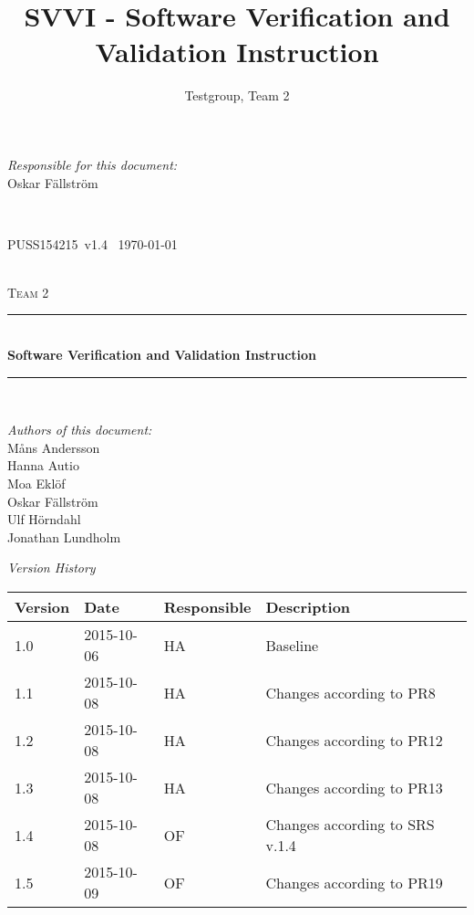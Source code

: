 \documentclass[a4paper]{article}
\title{SVVI - Software Verification and Validation Instruction}
\author{Testgroup, Team 2}
\newcommand{\version}{v1.4}
\newcommand{\SVVI}{PUSS154215}
\begin{document}
\begin{titlepage}
\newcommand{\HRule}{\rule{\linewidth}{0.5mm}}

\begin{minipage}{0.5\textwidth}
\begin{flushleft} %
\textit{Responsible for this document:}\\
Oskar Fällström %
\end{flushleft}
\end{minipage}
~
\begin{minipage}{0.4\textwidth}
\begin{flushright}
\SVVI\ \version\ %
\today
\end{flushright}
\end{minipage}\\[3cm]

\centering
\textsc{\LARGE Team 2}\\[0.5cm]

\HRule \\[0.4cm]
{ \huge \bfseries Software Verification and Validation Instruction}\\[0.4cm] %
\HRule \\[1.5cm]

\vfill
\begin{flushleft}
\textit{Authors of this document:}\\
Måns Andersson \\
Hanna Autio \\
Moa Eklöf \\
Oskar Fällström \\
Ulf Hörndahl \\
Jonathan Lundholm
\end{flushleft}


\end{titlepage}

\begin{center}
\textit{\large Version History}

    \begin{tabular}{ | l | l | l | p{5cm} |}
    \hline
    \textbf{Version}		& \textbf{Date}		& \textbf{Responsible}					& \textbf{Description}					\\ \hline
    1.0						& 2015-10-06			& HA									& Baseline								\\ \hline
    1.1						& 2015-10-08			& HA									& Changes according to PR8				\\ \hline
    1.2						& 2015-10-08			& HA									& Changes according to PR12 		\\ \hline
    1.3						& 2015-10-08			& HA									& Changes according to PR13		\\ \hline
    1.4						& 2015-10-08			& OF									& Changes according to SRS v.1.4		\\ \hline
    1.5						& 2015-10-09			& OF									& Changes according to PR19	\\ \hline
    \end{tabular}
\end{center}
\end{document}
